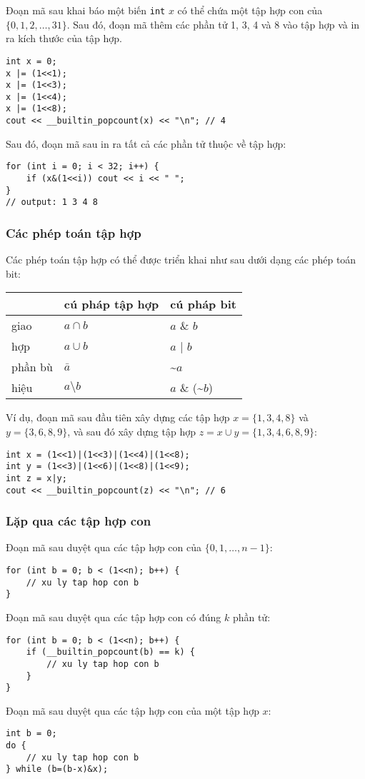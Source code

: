 Đoạn mã sau khai báo một biến \texttt{int}
$x$ có thể chứa
một tập hợp con của $\{0,1,2,\ldots,31\}$.
Sau đó, đoạn mã thêm các phần tử 1, 3, 4 và 8
vào tập hợp và in ra kích thước của tập hợp.
\begin{lstlisting}
int x = 0;
x |= (1<<1);
x |= (1<<3);
x |= (1<<4);
x |= (1<<8);
cout << __builtin_popcount(x) << "\n"; // 4
\end{lstlisting}
Sau đó, đoạn mã sau in ra tất cả các
phần tử thuộc về tập hợp:
\begin{lstlisting}
for (int i = 0; i < 32; i++) {
    if (x&(1<<i)) cout << i << " ";
}
// output: 1 3 4 8
\end{lstlisting}

\subsubsection{Các phép toán tập hợp}

Các phép toán tập hợp có thể được triển khai như sau dưới dạng các phép toán bit:

\begin{center}
\begin{tabular}{lll}
& cú pháp tập hợp & cú pháp bit \\
\hline
giao & $a \cap b$ & $a$ \& $b$ \\
hợp & $a \cup b$ & $a$ | $b$ \\
phần bù & $\bar a$ & \textasciitilde$a$ \\
hiệu & $a \setminus b$ & $a$ \& (\textasciitilde$b$) \\
\end{tabular}
\end{center}

Ví dụ, đoạn mã sau đầu tiên xây dựng
các tập hợp $x=\{1,3,4,8\}$ và $y=\{3,6,8,9\}$,
và sau đó xây dựng tập hợp $z = x \cup y = \{1,3,4,6,8,9\}$:

\begin{lstlisting}
int x = (1<<1)|(1<<3)|(1<<4)|(1<<8);
int y = (1<<3)|(1<<6)|(1<<8)|(1<<9);
int z = x|y;
cout << __builtin_popcount(z) << "\n"; // 6
\end{lstlisting}

\subsubsection{Lặp qua các tập hợp con}

Đoạn mã sau duyệt qua
các tập hợp con của $\{0,1,\ldots,n-1\}$:

\begin{lstlisting}
for (int b = 0; b < (1<<n); b++) {
    // xu ly tap hop con b
}
\end{lstlisting}
Đoạn mã sau duyệt qua
các tập hợp con có đúng $k$ phần tử:
\begin{lstlisting}
for (int b = 0; b < (1<<n); b++) {
    if (__builtin_popcount(b) == k) {
        // xu ly tap hop con b
    }
}
\end{lstlisting}
Đoạn mã sau duyệt qua các tập hợp con
của một tập hợp $x$:
\begin{lstlisting}
int b = 0;
do {
    // xu ly tap hop con b
} while (b=(b-x)&x);
\end{lstlisting}

